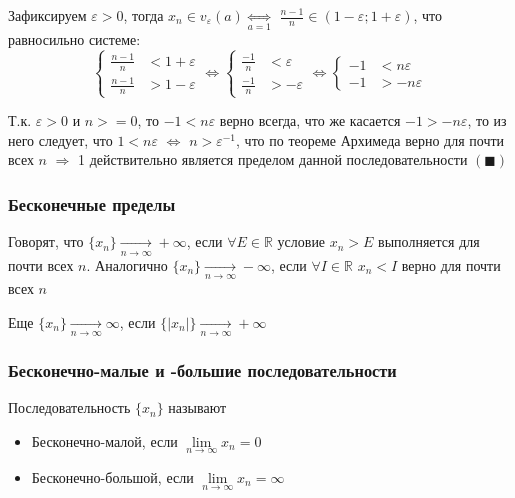 \documentclass[class=article,a4paper,12pt,crop=false]{standalone}
\begin{document}
Зафиксируем $\varepsilon > 0$, тогда $x_n \in v_{\varepsilon}(a) \underset{a = 1}{\Leftrightarrow}$
$\frac{n - 1}{n} \in (1 - \varepsilon; 1 + \varepsilon)$, что равносильно системе:
\begin{equation}
  \begin{cases}
    \frac{n - 1}{n} &< 1 + \varepsilon \\
    \frac{n - 1}{n} &> 1 - \varepsilon
  \end{cases} \Leftrightarrow
  \begin{cases}
    \frac{-1}{n} &< \varepsilon \\
    \frac{-1}{n} &> -\varepsilon
  \end{cases} \Leftrightarrow
  \begin{cases}
    -1 &< n\varepsilon \\
    -1 &> -n\varepsilon
  \end{cases}
\end{equation}

Т.к. $\varepsilon > 0$ и $n >= 0$, то $-1 < n\varepsilon$ верно всегда, что же касается $-1 > -n\varepsilon$,
то из него следует, что $1 < n\varepsilon$ $\Leftrightarrow$ $n > \varepsilon^{-1}$, что по теореме
Архимеда верно для почти всех $n$ $\Rightarrow$ 1 действительно является пределом данной
последовательности $(\blacksquare)$

\subsubsection{Бесконечные пределы}

Говорят, что $\{x_n\} \underset{n \rightarrow \infty}{\rightarrow} +\infty$, если $\forall E \in \mathbb{R}$
условие $x_n > E$ выполняется для почти всех $n$. Аналогично $\{x_n\} \underset{n \rightarrow \infty}{\rightarrow} -\infty$,
если $\forall I \in \mathbb{R}$ $x_n < I$ верно для почти всех $n$

Еще $\{x_n\} \underset{n \rightarrow \infty}{\rightarrow} \infty$, если $\{|x_n|\} \underset{n \rightarrow \infty}{\rightarrow} +\infty$

\subsubsection{Бесконечно-малые и -большие последовательности}

Последовательность $\{x_n\}$ называют
\begin{itemize}
  \item {
    Бесконечно-малой, если $\lim\limits_{n \rightarrow \infty}{x_n} = 0$
  }
  \item {
    Бесконечно-большой, если $\lim\limits_{n \rightarrow \infty}{x_n} = \infty$
  }
\end{itemize}
\end{document}
